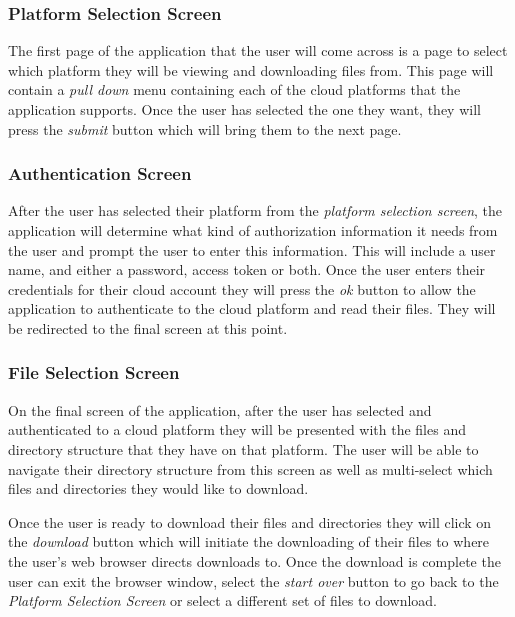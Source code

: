 \documentclass{article}
\begin{document}
      \subsubsection{Platform Selection Screen}
      The first page of the application that the user will come across is a page to select which platform they will be
      viewing and downloading files from. This page will contain a \textit{pull down} menu containing each of the
      cloud platforms that the application supports. Once the user has selected the one they want, they will press the
      \textit{submit} button which will bring them to the next page.

      \subsubsection{Authentication Screen}
      After the user has selected their platform from the \textit{platform selection screen}, the application will
      determine what kind of authorization information it needs from the user and prompt the user to enter this information.
      This will include a user name, and either a password, access token or both. Once the user enters their credentials for
      their cloud account they will press the \textit{ok} button to allow the application to authenticate to the cloud platform
      and read their files. They will be redirected to the final screen at this point.
    
      \subsubsection{File Selection Screen}
      On the final screen of the application, after the user has selected and authenticated to a cloud platform they will be
      presented with the files and directory structure that they have on that platform. The user will be able to navigate their
      directory structure from this screen as well as multi-select which files and directories they would like to download.

      Once the user is ready to download their files and directories they will click on the \textit{download} button which will
      initiate the downloading of their files to where the user's web browser directs downloads to. Once the download is complete
      the user can exit the browser window, select the \textit{start over} button to go back to the \textit{Platform Selection Screen}
      or select a different set of files to download.
    
\end{document}
